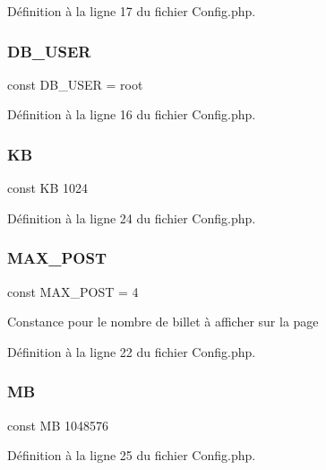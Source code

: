 Définition à la ligne 17 du fichier Config.\+php.

\mbox{\label{_config_8php_a1d1d99f8e08f387d84fe9848f3357156}} 
\subsubsection{\texorpdfstring{D\+B\+\_\+\+U\+S\+ER}{DB\_USER}}
{\footnotesize\ttfamily const D\+B\+\_\+\+U\+S\+ER = \textquotesingle{}root\textquotesingle{}}



Définition à la ligne 16 du fichier Config.\+php.

\mbox{\label{_config_8php_a4f06cdd0c63f3ce691804d6c90ea6c32}} 
\subsubsection{\texorpdfstring{KB}{KB}}
{\footnotesize\ttfamily const KB 1024}



Définition à la ligne 24 du fichier Config.\+php.

\mbox{\label{_config_8php_ae6f0a6c86ad9f61cbc99ad3c4180b481}} 
\subsubsection{\texorpdfstring{M\+A\+X\+\_\+\+P\+O\+ST}{MAX\_POST}}
{\footnotesize\ttfamily const M\+A\+X\+\_\+\+P\+O\+ST = 4}

Constance pour le nombre de billet à afficher sur la page 

Définition à la ligne 22 du fichier Config.\+php.

\mbox{\label{_config_8php_a91c734126e699a6ba53fe57e06bb8b49}} 
\subsubsection{\texorpdfstring{MB}{MB}}
{\footnotesize\ttfamily const MB 1048576}



Définition à la ligne 25 du fichier Config.\+php.

